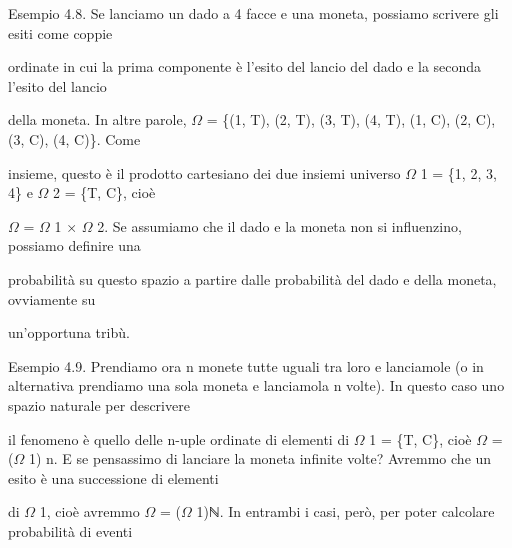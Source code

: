 \documentclass[a4paper,portrait,12pt]{article}
\begin{document}
\begin{flushleft}
Esempio 4.8. Se lanciamo un dado a 4 facce e una moneta, possiamo scrivere gli esiti come coppie
\end{flushleft}


\begin{flushleft}
ordinate in cui la prima componente \`{e} l'esito del lancio del dado e la seconda l'esito del lancio
\end{flushleft}


\begin{flushleft}
della moneta. In altre parole, $\Omega$ = \{(1, T), (2, T), (3, T), (4, T), (1, C), (2, C), (3, C), (4, C)\}. Come
\end{flushleft}


\begin{flushleft}
insieme, questo \`{e} il prodotto cartesiano dei due insiemi universo $\Omega$ 1 = \{1, 2, 3, 4\} e $\Omega$ 2 = \{T, C\}, cio\`{e}
\end{flushleft}


\begin{flushleft}
$\Omega$ = $\Omega$ 1 × $\Omega$ 2. Se assumiamo che il dado e la moneta non si influenzino, possiamo definire una
\end{flushleft}


\begin{flushleft}
probabilit\`{a} su questo spazio a partire dalle probabilit\`{a} del dado e della moneta, ovviamente su
\end{flushleft}


\begin{flushleft}
un'opportuna tribù.
\end{flushleft}


\begin{flushleft}
Esempio 4.9. Prendiamo ora n monete tutte uguali tra loro e lanciamole (o in alternativa prendiamo una sola moneta e lanciamola n volte). In questo caso uno spazio naturale per descrivere
\end{flushleft}


\begin{flushleft}
il fenomeno \`{e} quello delle n-uple ordinate di elementi di $\Omega$ 1 = \{T, C\}, cio\`{e} $\Omega$ = ($\Omega$ 1) n. E se pensassimo di lanciare la moneta infinite volte? Avremmo che un esito \`{e} una successione di elementi
\end{flushleft}


\begin{flushleft}
di $\Omega$ 1, cio\`{e} avremmo $\Omega$ = ($\Omega$ 1)ℕ. In entrambi i casi, per\`{o}, per poter calcolare probabilit\`{a} di eventi
\end{flushleft}
\end{document}
